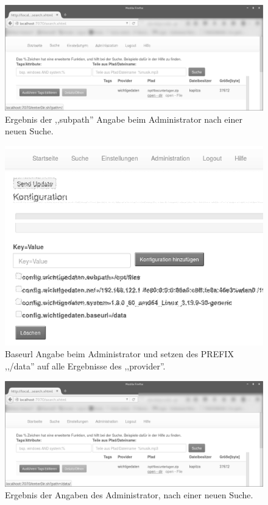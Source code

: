 \documentclass[oneside, ngerman, toc=bibliography,bibliography=totoc,listof=entryprefix, open=right,numbers=noenddot,fontsize=12pt]{scrbook}
\begin{document}
\begin{figure}[htbp] 
    \centering
    \includegraphics[width=\textwidth]{Masterarbeit_Bilder/admin_remove_sub.png}
    \caption{Ergebnis der ,,subpath'' Angabe beim Administrator nach einer neuen Suche.}
    \label{fig:www-subpath_0}
\end{figure}  
\begin{figure}[htbp] 
    \centering
    \includegraphics[width=\textwidth]{Masterarbeit_Bilder/admin_change_mount.png}
    \caption{Baseurl Angabe beim Administrator und setzen des PREFIX ,,/data'' auf alle Ergebnisse des ,,provider''.}
    \label{fig:www-subpath2}
\end{figure}  

\begin{figure}[htbp] 
    \centering
    \includegraphics[width=\textwidth]{Masterarbeit_Bilder/open_mount_dir_0.png}
    \caption{Ergebnis der Angaben des Administrator, nach einer neuen Suche.}
    \label{fig:www-erg}
\end{figure}  
\end{document}
